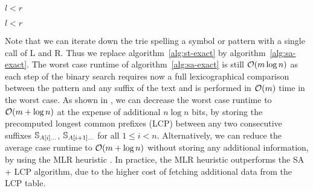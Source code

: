 \begin{algorithm}[h!]
\begin{minipage}[t]{.5\textwidth}
\label{alg:sa-godown}
\begin{algorithmic}[1]
		\State \Return \False
	\EndIf
	\EndWhile
	\EndIf
	\State \Return \True
\EndProcedure
\end{algorithmic}
\end{minipage}
\begin{minipage}[t]{.5\textwidth}
\label{alg:sa-goright}
\begin{algorithmic}[1]
		\State \Return \False
	\EndIf
	\EndIf
	\State \Return $l < r$
\EndProcedure
\end{algorithmic}
\begin{algorithmic}[1]
	\State \Return $l < r$
\EndProcedure
\end{algorithmic}
\end{minipage}
\end{algorithm}

Note that we can iterate down the trie spelling a symbol or pattern with a single call of \textsc{L} and \textsc{R}.
Thus we replace algorithm~\ref{alg:st-exact} by algorithm~\ref{alg:sa-exact}.
The worst case runtime of algorithm~\ref{alg:sa-exact} is still $\mathcal{O}(m \log{n})$ as each step of the binary search requires now a full lexicographical comparison between the pattern and any suffix of the text and is performed in $\mathcal{O}(m)$ time in the worst case.
As shown in \citep{Manber1990}, we can decrease the worst case runtime to $\mathcal{O}(m + \log{n})$ at the expense of additional $n \log{n}$ bits, by storing the precomputed longest common prefixes (LCP) between any two consecutive suffixes $\mathbb {S}_{A[i] \dots}$, $\mathbb {S}_{A[i+1] \dots}$ for all $1 \leq i < n$.
Alternatively, we can reduce the average case runtime to $\mathcal{O}(m + \log{n})$ without storing any additional information, by using the MLR heuristic \citep{Manber1990}.
In practice, the MLR heuristic outperforms the SA + LCP algorithm, due to the higher cost of fetching additional data from the LCP table.

